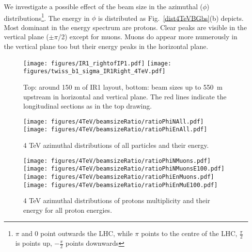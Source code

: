 We investigate a possible effect of the beam size in the azimuthal ($\phi$) distributions\footnote{$\pi$ and $0$ point outwards the LHC, while $\pi$ points to the centre of the LHC, $\frac{\pi}{2}$ is points up, $-\frac{\pi}{2}$ points downwards}. The energy in $\phi$ is distributed as Fig.~\ref{dist4TeVBGbs}(b) depicts. Most dominant in the energy spectrum are protons. Clear peaks are visible in the vertical plane ($\pm\pi$/2) except for muons. Muons do appear more numerously in the vertical plane too but their energy peaks in the horizontal plane.

\begin{figure}[!htb]
\begin{center}
  \texttt{[image: figures/IR1\_rightofIP1.pdf]}
  \texttt{[image: figures/twiss\_b1\_sigma\_IR1Right\_4TeV.pdf]}
\end{center}
\vspace{-0.6cm}
 \caption{Top: around 150 m of IR1 layout, bottom: beam sizes up to 550~m upstream in horizontal and vertical plane. The red lines indicate the longitudinal sections as in the top drawing. 
  \label{twissfileBS}}
\end{figure}

\begin{figure}[!htb]
\begin{center}
  \texttt{[image: figures/4TeV/beamsizeRatio/ratioPhiNAll.pdf]}
  \texttt{[image: figures/4TeV/beamsizeRatio/ratioPhiEnAll.pdf]}
\end{center}
\vspace{-0.6cm}
 \caption{4 TeV azimuthal distributions of all particles and their energy.
  \label{bsRatioPhiAll}}
\end{figure}

\begin{figure}[!htb]
\begin{center}
  \texttt{[image: figures/4TeV/beamsizeRatio/ratioPhiNMuons.pdf]}
  \texttt{[image: figures/4TeV/beamsizeRatio/ratioPhiNMuonsE100.pdf]}
  \texttt{[image: figures/4TeV/beamsizeRatio/ratioPhiEnMuons.pdf]}
  \texttt{[image: figures/4TeV/beamsizeRatio/ratioPhiEnMuE100.pdf]}

\end{center}
\vspace{-0.6cm}
 \caption{4 TeV azimuthal distributions of protons multiplicity and their energy for all proton energies.
  \label{bsRatioPhiNPr}}
\end{figure}

